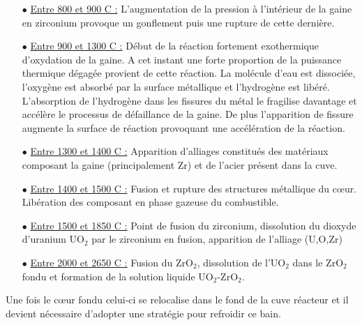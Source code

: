 \begin{itemize}
	\item[$\bullet$] \underline{Entre 800 et 900 \textdegree C :} L'augmentation de la pression à l'intérieur de la gaine en zirconium provoque un gonflement puis une rupture de cette dernière.
	\item[$\bullet$] \underline{Entre 900 et 1300 \textdegree C :} Début de la réaction fortement exothermique d'oxydation de la gaine. A cet instant une forte proportion de la puissance thermique dégagée provient de cette réaction. La molécule d'eau est dissociée, l'oxygène est absorbé par la surface métallique et l'hydrogène est libéré. L'absorption de l'hydrogène dans les fissures du métal le fragilise davantage et accélère le processus de défaillance de la gaine. De plus l'apparition de fissure augmente la surface de réaction provoquant une accélération de la réaction.
	\item[$\bullet$] \underline{Entre 1300 et 1400 \textdegree C :} Apparition d'alliages constitués des matériaux composant la gaine (principalement Zr) et de l'acier présent dans la cuve.
	\item[$\bullet$] \underline{Entre 1400 et 1500 \textdegree C :} Fusion et rupture des structures métallique du c\oe ur. Libération des composant en phase gazeuse du combustible.
	\item[$\bullet$] \underline{Entre 1500 et 1850 \textdegree C :} Point de fusion du zirconium, dissolution du dioxyde d'uranium UO$_2$ par le zirconium en fusion, apparition de l'alliage (U,O,Zr)
	\item[$\bullet$] \underline{Entre 2000 et 2650 \textdegree C :} Fusion du ZrO$_2$, dissolution de l'UO$_2$ dans le ZrO$_2$ fondu et formation de la solution liquide UO$_2$-ZrO$_2$.
\end{itemize}
Une fois le c\oe ur fondu celui-ci se relocalise dans le fond de la cuve réacteur et il devient nécessaire d'adopter une stratégie pour refroidir ce bain.

